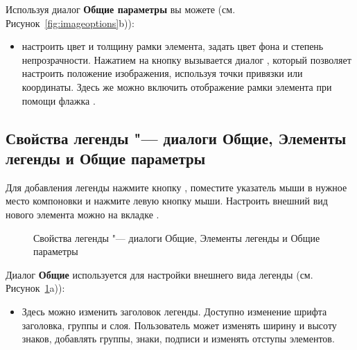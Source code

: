
Используя диалог \textbf{Общие параметры} вы можете
(см. Рисунок~\ref{fig:imageoptions}b)):

\begin{itemize}[label=--]
\item настроить цвет и толщину рамки элемента, задать
цвет фона и степень непрозрачности. Нажатием на кнопку 
вызывается диалог , который позволяет
настроить положение изображения, используя точки привязки или координаты.
Здесь же можно включить отображение рамки элемента при помощи флажка
.
\end{itemize}

\subsection{Свойства легенды "--- диалоги Общие, Элементы легенды и Общие параметры}

Для добавления легенды нажмите кнопку
, поместите указатель
мыши в нужное место компоновки и нажмите левую кнопку мыши. Настроить
внешний вид нового элемента можно на вкладке .

\begin{figure}[h]
\centering
   \hspace{1cm}
   \hspace{1cm}
   \caption{Свойства легенды "--- диалоги Общие, Элементы легенды и Общие параметры \nixcaption}\label{fig:legendoptions}
\end{figure}


Диалог \textbf{Общие} используется для настройки внешнего вида
легенды (см. Рисунок~\ref{fig:legendoptions}a)):

\begin{itemize}[label=--]
\item Здесь можно изменить заголовок легенды. Доступно изменение шрифта
заголовка, группы и слоя. Пользователь может изменять ширину и высоту
знаков, добавлять группы, знаки, подписи и изменять отступы элементов.
\end{itemize}

